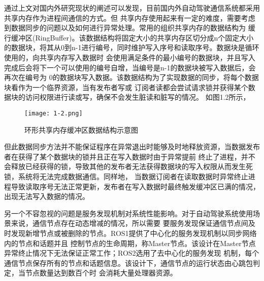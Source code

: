 通过上文对国内外研究现状的阐述可以发现，目前国内外自动驾驶通信系统都采用共享内存作为进程间通信的方式。但
共享内存使用起来有一定的难度，需要考虑到数据同步的问题以及如何进行异常处理。常用的组织共享内存的数据结构为
缓行缓冲区(RingBuffer)。该数据结构将固定大小的共享内存区切分成n个固定大小的数据块，将其从0到n-1进行编号，同时维护写入序号和读取序号。数据块是循环使用的，向共享内存写入数据时
会使用满足条件的最小编号的数据块，并且写入完成后会将下一个可以使用的编号自增，当编号是n-1的数据块被写入数据后，会再次在编号为
0的数据块写入数据。该数据结构为了实现数据的同步，将每个数据块看作为一个临界资源，当有发布者写或
订阅者读都会尝试请求锁并获得某个数据块的访问权限进行读或写，确保不会发生脏读和脏写的情况\cite{9235068}。
如图1.2所示，
\begin{figure}[htb]
  \centering
  \texttt{[image: 1-2.png]}
  \caption{环形共享内存缓冲区数据结构示意图}
  \label{2}
\end{figure}
但此数据同步方法并不能保证程序在异常退出时能够及时地释放资源，当数据发布者在获得了某个数据块的锁并且正在写入数据时由于异常提前
终止了进程，并不会释放已经获得的锁，导致其他的发布者无法获得数据块的写入权限从而发生死锁，系统将无法完成数据通信。同样地，
当数据订阅者在读取数据时异常终止进程导致读取序号无法正常更新，发布者在写入数据时最终触发缓冲区已满的情况，出现无法写入数据的情况。

另一个不容忽视的问题是服务发现机制对系统性能影响。对于自动驾驶系统使用场景来说，通信节点存在动态增减的情况，所以需要
要服务发现保证通信节点间及时发现新增节点或被删除的节点。ROS1提供了中心化的服务发现机制以同步网络内的节点和话题并且
控制节点的生命周期，称Master节点。该设计在Master节点异常终止情况下无法保证正常工作；ROS2选用了去中心化的服务发现
机制，每个通信节点保存所有的节点和话题信息。该设计下，通信节点的运行状态由心跳包判定，当节点数量达到数百个时
会消耗大量处理器资源\cite{9355690}。


